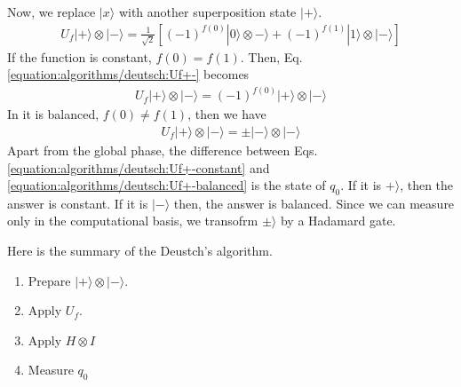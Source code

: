 \documentclass[letterpaper,10pt,english]{jupyterBook}
\begin{document}
\sphinxAtStartPar
Now, we replace \(|x\rangle\) with another superposition state \(|+\rangle\).
\begin{equation}\label{equation:algorithms/deutsch:Uf+-}
\begin{split}
U_f |+\rangle \otimes |-\rangle = \frac{1}{\sqrt{2}} \left [ (-1)^{f(0)} |0\rangle \otimes -\rangle + (-1)^{f(1)} | 1 \rangle \otimes |-\rangle \right ]
\end{split}
\end{equation}
\sphinxAtStartPar
If the function is constant, \(f(0)=f(1)\).  Then, Eq. \eqref{equation:algorithms/deutsch:Uf+-} becomes
\begin{equation}\label{equation:algorithms/deutsch:Uf+-constant}
\begin{split}
U_f |+\rangle \otimes |-\rangle = (-1)^{f(0)} |+\rangle \otimes |-\rangle
\end{split}
\end{equation}
\sphinxAtStartPar
In it is balanced, \(f(0)\ne f(1)\), then we have
\begin{equation}\label{equation:algorithms/deutsch:Uf+-balanced}
\begin{split}
U_f |+\rangle \otimes |-\rangle = \pm |-\rangle \otimes |-\rangle
\end{split}
\end{equation}
\sphinxAtStartPar
Apart from the global phase, the difference between Eqs. \eqref{equation:algorithms/deutsch:Uf+-constant} and \eqref{equation:algorithms/deutsch:Uf+-balanced} is the state of \(q_0\).  If it is \(+\rangle\), then the answer is constant. If it is \(|-\rangle\) then, the answer is balanced.  Since we can measure only in the computational basis, we transofrm \(\pm\rangle\) by a Hadamard gate.

\sphinxAtStartPar
Here is the summary of the Deustch’s algorithm.
\begin{enumerate}
%
\item {}
\sphinxAtStartPar
Prepare \(|+\rangle \otimes |-\rangle\).

\item {}
\sphinxAtStartPar
Apply \(U_f\).

\item {}
\sphinxAtStartPar
Apply \(H \otimes I\)

\item {}
\sphinxAtStartPar
Measure \(q_0\)

\end{enumerate}
\end{document}
